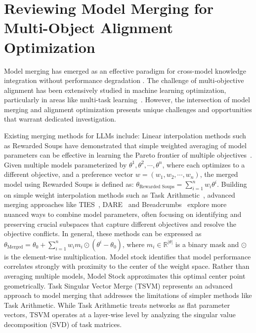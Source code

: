 \section{Reviewing Model Merging for Multi-Object Alignment Optimization}
\label{section:review_model_merging}
Model merging has emerged as an effective paradigm for cross-model knowledge integration without performance degradation \cite{yang2024model}.
The challenge of multi-objective alignment has been extensively studied in machine learning optimization, particularly in areas like multi-task learning~\cite{sener2018multi,liu2022auto,tang2024fusionbench}.
However, the intersection of model merging and alignment optimization presents unique challenges and opportunities that warrant dedicated investigation.

Existing merging methods for LLMs \cite{goddard2024arcee} include: Linear interpolation methods such as Rewarded Soups have demonstrated that simple weighted averaging of model parameters can be effective in learning the Pareto frontier of multiple objectives~\citep{rame2024rewarded}.
Given multiple models parameterized by $\theta^1, \theta^2, \cdots, \theta^n$, where each optimizes to a different objective, and a preference vector $w = (w_1, w_2, \cdots, w_n)$, the merged model using Rewarded Soups is defined as:
$\theta_{\text{Rewarded Soups}} = \sum_{i=1}^n w_i \theta^i$.
Building on simple weight interpolation methods such as Task Arithmetic~\citep{ilharco2022editing}, advanced merging approaches like TIES~\citep{yadav2024ties}, DARE~\citep{yu2024language} and Breadcrumbs~\citep{davari2025model} explore more nuanced ways to combine model parameters, often focusing on identifying and preserving crucial subspaces that capture different objectives and resolve the objective conflicts.
In general, these methods can be expressed as $\theta_{\text{Merged}} = \theta_0 + \sum_{i=1}^n w_i m_i \odot (\theta^i - \theta_0)$, where $m_i\in\mathbb{R}^{|\theta|}$ is a binary mask and $\odot$ is the element-wise multiplication.
Model stock \cite{jang2025model} identifies that model performance correlates strongly with proximity to the center of the weight space. Rather than averaging multiple models, Model Stock approximates this optimal center point geometrically.
Task Singular Vector Merge (TSVM) \cite{gargiulo2024task} represents an advanced approach to model merging that addresses the limitations of simpler methods like Task Arithmetic. While Task Arithmetic treats networks as flat parameter vectors, TSVM operates at a layer-wise level by analyzing the singular value decomposition (SVD) of task matrices.

